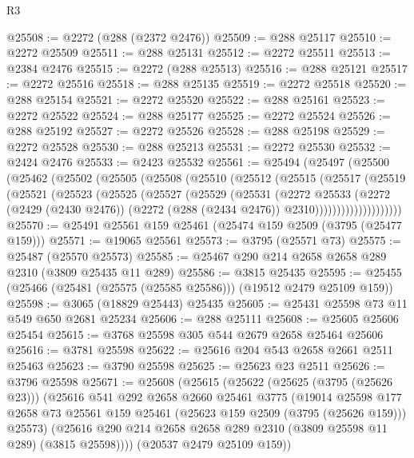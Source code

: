 \begin{lexlean}{R3}
\begin{coremodule}
@25508 := @2272 (@288 (@2372 @2476))
@25509 := @288 @25117
@25510 := @2272 @25509
@25511 := @288 @25131
@25512 := @2272 @25511
@25513 := @2384 @2476
@25515 := @2272 (@288 @25513)
@25516 := @288 @25121
@25517 := @2272 @25516
@25518 := @288 @25135
@25519 := @2272 @25518
@25520 := @288 @25154
@25521 := @2272 @25520
@25522 := @288 @25161
@25523 := @2272 @25522
@25524 := @288 @25177
@25525 := @2272 @25524
@25526 := @288 @25192
@25527 := @2272 @25526
@25528 := @288 @25198
@25529 := @2272 @25528
@25530 := @288 @25213
@25531 := @2272 @25530
@25532 := @2424 @2476
@25533 := @2423 @25532
@25561 := @25494
    (@25497
      (@25500
        (@25462
          (@25502
            (@25505
              (@25508
                (@25510
                  (@25512
                    (@25515
                      (@25517
                        (@25519
                          (@25521
                            (@25523
                              (@25525
                                (@25527
                                  (@25529
                                    (@25531
                                      (@2272
                                        @25533
                                        (@2272
                                          (@2429 (@2430 @2476))
                                          (@2272 (@288 (@2434 @2476)) @2310))))))))))))))))))))
@25570 := @25491 @25561 @159 @25461 (@25474 @159 @2509 (@3795 (@25477 @159)))
@25571 := @19065 @25561
@25573 := @3795 (@25571 @73)
@25575 := @25487 (@25570 @25573)
@25585 := @25467 @290 @214 @2658 @2658 @289 @2310 (@3809 @25435 @11 @289)
@25586 := @3815 @25435
@25595 := @25455 (@25466 (@25481 (@25575 (@25585 @25586))) (@19512 @2479 @25109 @159))
@25598 := @3065 (@18829 @25443) @25435
@25605 := @25431 @25598 @73 @11 @549 @650 @2681 @25234
@25606 := @288 @25111
@25608 := @25605 @25606 @25454
@25615 := @3768 @25598 @305 @544 @2679 @2658 @25464 @25606
@25616 := @3781 @25598
@25622 := @25616 @204 @543 @2658 @2661 @2511 @25463
@25623 := @3790 @25598
@25625 := @25623 @23 @2511
@25626 := @3796 @25598
@25671 := @25608
    (@25615
      (@25622
        (@25625 (@3795 (@25626 @23)))
        (@25616
          @541
          @292
          @2658
          @2660
          @25461
          @3775
          (@19014
            @25598
            @177
            @2658
            @73
            @25561
            @159
            @25461
            (@25623 @159 @2509 (@3795 (@25626 @159)))
            @25573)
          (@25616 @290 @214 @2658 @2658 @289 @2310 (@3809 @25598 @11 @289) (@3815 @25598))))
      (@20537 @2479 @25109 @159))

\end{coremodule}
\end{lexlean}
